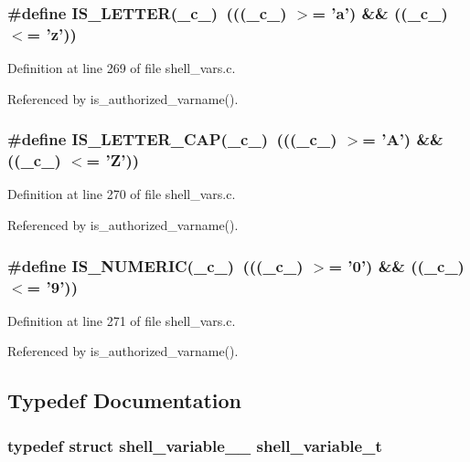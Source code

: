 \subsubsection{\setlength{\rightskip}{0pt plus 5cm}\#define IS\_\-LETTER(\_\-c\_\-)\ (((\_\-c\_\-) $>$= 'a') \&\& ((\_\-c\_\-) $<$= 'z'))}\label{shell__vars_8c_a0}




Definition at line 269 of file shell\_\-vars.c.

Referenced by is\_\-authorized\_\-varname().
\subsubsection{\setlength{\rightskip}{0pt plus 5cm}\#define IS\_\-LETTER\_\-CAP(\_\-c\_\-)\ (((\_\-c\_\-) $>$= 'A') \&\& ((\_\-c\_\-) $<$= 'Z'))}\label{shell__vars_8c_a1}




Definition at line 270 of file shell\_\-vars.c.

Referenced by is\_\-authorized\_\-varname().
\subsubsection{\setlength{\rightskip}{0pt plus 5cm}\#define IS\_\-NUMERIC(\_\-c\_\-)\ (((\_\-c\_\-) $>$= '0') \&\& ((\_\-c\_\-) $<$= '9'))}\label{shell__vars_8c_a2}




Definition at line 271 of file shell\_\-vars.c.

Referenced by is\_\-authorized\_\-varname().

\subsection{Typedef Documentation}
\subsubsection{\setlength{\rightskip}{0pt plus 5cm}typedef struct {\bf shell\_\-variable\_\-\_\-}  {\bf shell\_\-variable\_\-t}}\label{shell__vars_8c_a3}




